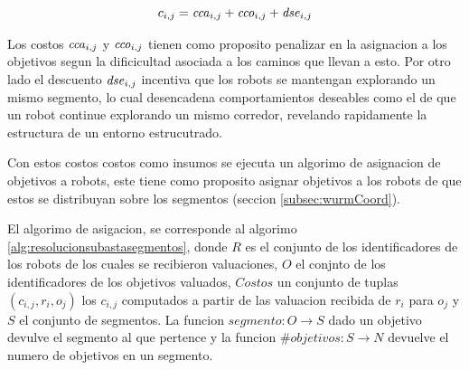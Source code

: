 \begin{equation} 
  c_{i,j} = \mathit{cca}_{i,j} + \mathit{cco}_{i,j} + \mathit{dse}_{i,j}
  \label{eq:costoTot}
\end{equation}

Los costos $\mathit{cca}_{i,j}$ y $\mathit{cco}_{i,j}$ tienen como proposito
penalizar en la asignacion a los objetivos segun la dificicultad asociada a los
caminos que llevan a esto. Por otro lado el descuento $\mathit{dse}_{i,j}$
incentiva que los robots se mantengan explorando un mismo segmento, lo cual
desencadena comportamientos deseables como el de que un robot continue
explorando un mismo corredor, revelando rapidamente la estructura de un entorno
estrucutrado.




Con estos costos costos como insumos se ejecuta un algorimo de asignacion de
objetivos a robots, este tiene como proposito asignar objetivos a los robots de
que estos se distribuyan sobre los segmentos (seccion \ref{subsec:wurmCoord}).

El algorimo de asigacion, se corresponde al algorimo
\ref{alg:resolucionsubastasegmentos}, donde $R$ es el conjunto de los
identificadores de los robots de los cuales se recibieron valuaciones, $O$ el
conjnto de los identificadores de los objetivos valuados, $Costos$ un conjunto
de tuplas $(c_{i,j},r_i,o_j)$ los $c_{i,j}$ computados a partir de las
valuacion recibida de $r_i$ para $o_j$ y $S$ el conjunto de
segmentos. La funcion $segmento : O \rightarrow S$ dado un objetivo devulve el
segmento al que pertence y la funcion $\#objetivos : S \rightarrow N$ devuelve
el numero de objetivos en un segmento.

